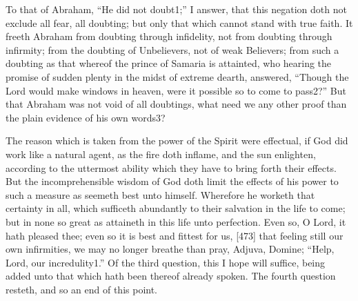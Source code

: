 To that of Abraham, “He did not doubt1;” I answer, that this negation doth not exclude all fear, all doubting; but only that which cannot stand with true faith. It freeth Abraham from doubting through infidelity, not from doubting through infirmity; from the doubting of Unbelievers, not of weak Believers; from such a doubting as that whereof the prince of Samaria is attainted, who hearing the promise of sudden plenty in the midst of extreme dearth, answered, “Though the Lord would make windows in heaven, were it possible so to come to pass2?” But that Abraham was not void of all doubtings, what need we any other proof than the plain evidence of his own words3?

The reason which is taken from the power of the Spirit were effectual, if God did work like a natural agent, as the fire doth inflame, and the sun enlighten, according to the uttermost ability which they have to bring forth their effects. But the incomprehensible wisdom of God doth limit the effects of his power to such a measure as seemeth best unto himself. Wherefore he worketh that certainty in all, which sufficeth abundantly to their salvation in the life to come; but in none so great as attaineth in this life unto perfection. Even so, O Lord, it hath pleased thee; even so it is best and fittest for us, [473] that feeling still our own infirmities, we may no longer breathe than pray, Adjuva, Domine; “Help, Lord, our incredulity1.” Of the third question, this I hope will suffice, being added unto that which hath been thereof already spoken. The fourth question resteth, and so an end of this point.

